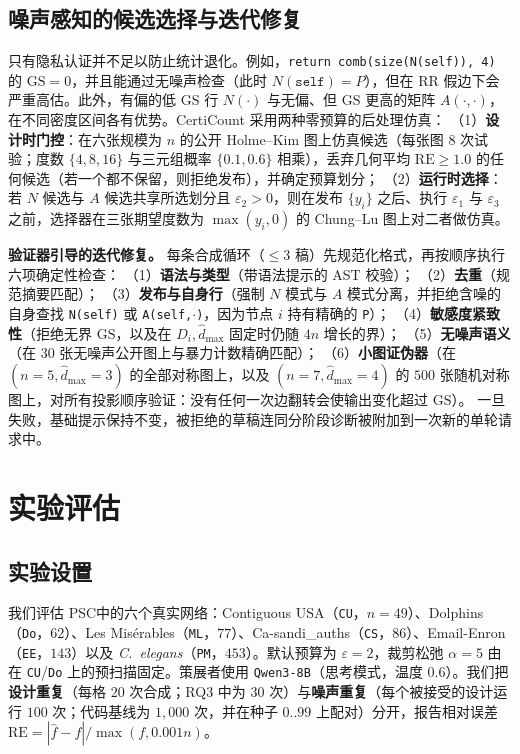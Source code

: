 \documentclass[11pt]{article}
\newlength{\zhindent}
\newcommand{\parhead}[1]{\par\noindent\hspace*{\zhindent}\textbf{#1}}
\theoremstyle{ieeeitalic}
\newcommand{\GS}{\mathrm{GS}}
\newcommand{\dhatmax}{\hat{d}_{\max}}
\newcommand{\RE}{\mathrm{RE}}
\begin{document}
\subsection{噪声感知的候选选择与迭代修复}
\label{sec:selection}

只有隐私认证并不足以防止统计退化。例如，\texttt{return comb(size(N(self)), 4)} 的 $\GS=0$，并且能通过无噪声检查（此时 $N(\texttt{self})=P$），但在 RR 假边下会严重高估。此外，有偏的低 $\GS$ 行 $N(\cdot)$ 与无偏、但 $\GS$ 更高的矩阵 $A(\cdot,\cdot)$，在不同密度区间各有优势。CertiCount 采用两种零预算的后处理仿真：
（1）\textbf{设计时门控}：在六张规模为 $n$ 的公开 Holme--Kim 图\cite{holme2002growing}上仿真候选（每张图 $8$ 次试验；度数 $\{4,8,16\}$ 与三元组概率 $\{0.1,0.6\}$ 相乘），丢弃几何平均 $\RE \ge 1.0$ 的任何候选（若一个都不保留，则拒绝发布），并确定预算划分；
（2）\textbf{运行时选择}：若 $N$ 候选与 $A$ 候选共享所选划分且 $\varepsilon_2 > 0$，则在发布 $\{y_i\}$ 之后、执行 $\varepsilon_1$ 与 $\varepsilon_3$ 之前，选择器在三张期望度数为 $\max(y_i, 0)$ 的 Chung--Lu 图\cite{chung2002connected}上对二者做仿真。

\parhead{验证器引导的迭代修复。}
每条合成循环（$\le 3$ 稿）先规范化格式，再按顺序执行六项确定性检查：
（1）\textbf{语法与类型}（带语法提示的 AST 校验）；
（2）\textbf{去重}（规范摘要匹配）；
（3）\textbf{发布与自身行}（强制 $N$ 模式与 $A$ 模式分离，并拒绝含噪的自身查找 \texttt{N(self)} 或 \texttt{A(self,$\cdot$)}，因为节点 $i$ 持有精确的 \texttt{P}）；
（4）\textbf{敏感度紧致性}（拒绝无界 $\GS$，以及在 $D_i, \dhatmax$ 固定时仍随 $4n$ 增长的界）；
（5）\textbf{无噪声语义}（在 $30$ 张无噪声公开图上与暴力计数精确匹配）；
（6）\textbf{小图证伪器}（在 $(n=5, \dhatmax=3)$ 的全部对称图上，以及 $(n=7, \dhatmax=4)$ 的 $500$ 张随机对称图上，对所有投影顺序验证：没有任何一次边翻转会使输出变化超过 $\GS$）。
一旦失败，基础提示保持不变，被拒绝的草稿连同分阶段诊断被附加到一次新的单轮请求中。

\section{实验评估}
\label{sec:eval}

\subsection{实验设置}
\label{sec:setup}

我们评估 PSC\cite{zhang2026psc}中的六个真实网络：Contiguous USA（\texttt{CU}，$n=49$）、Dolphins（\texttt{Do}，$62$）、Les Misérables（\texttt{ML}，$77$）、Ca-sandi\_auths（\texttt{CS}，$86$）、Email-Enron（\texttt{EE}，$143$）以及 \textit{C.~elegans}（\texttt{PM}，$453$）。默认预算为 $\varepsilon=2$\cite{he2025robust,zhang2026psc}，裁剪松弛 $\alpha=5$ 由在 \texttt{CU}/\texttt{Do} 上的预扫描固定。策展者使用 \texttt{Qwen3-8B}（思考模式，温度 $0.6$）。我们把\textbf{设计重复}（每格 $20$ 次合成；RQ3 中为 $30$ 次）与\textbf{噪声重复}（每个被接受的设计运行 $100$ 次；代码基线为 $1{,}000$ 次，并在种子 $0..99$ 上配对）分开，报告相对误差 $\RE = |\hat{f} - f| / \max(f, 0.001n)$\cite{imola2022communication,zhang2026psc}。
\end{document}
